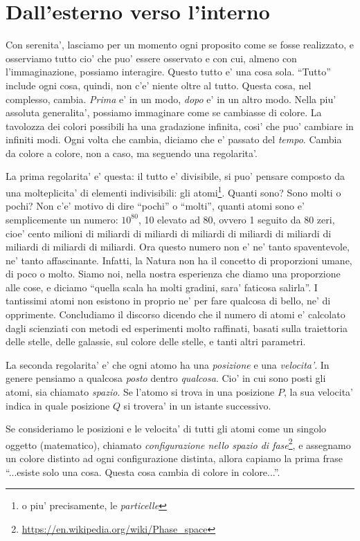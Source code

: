 \section{Dall'esterno verso l'interno}
\label{extInt}
Con serenita', lasciamo per un momento ogni proposito come se fosse realizzato, e osserviamo tutto cio' che puo' essere osservato e con cui, almeno con l'immaginazione, possiamo interagire. Questo tutto e' una cosa sola. ``Tutto'' include ogni cosa, quindi, non c'e' niente oltre al tutto.
Questa cosa, nel complesso, cambia. \emph{Prima} e' in un modo, \emph{dopo} e' in un altro modo. Nella piu' assoluta generalita', possiamo immaginare come se cambiasse di colore. La tavolozza dei colori possibili ha una gradazione infinita, cosi' che puo' cambiare in infiniti modi. Ogni volta che cambia, diciamo che e' passato del \emph{tempo}. Cambia da colore a colore, non a caso, ma seguendo una regolarita'. 

La prima regolarita' e' questa: il tutto e' divisibile, si puo' pensare composto da una molteplicita' di elementi indivisibili: gli atomi\footnote{o piu' precisamente, le \emph{particelle}}.
Quanti sono? Sono molti o pochi? Non c'e' motivo di dire ``pochi'' o ``molti'', quanti atomi sono  e' semplicemente un numero: $10^{80}$, 10 elevato ad 80, ovvero 1 seguito da 80 zeri, cioe' cento milioni di miliardi di miliardi di miliardi di miliardi di miliardi di miliardi di miliardi di miliardi. 
Ora questo numero non e' ne' tanto spaventevole, ne' tanto affascinante. Infatti, la Natura non ha il concetto di proporzioni umane, di poco o molto. Siamo noi, nella nostra esperienza che diamo una proporzione alle cose, e diciamo ``quella scala ha molti gradini, sara' faticosa salirla''. 
I tantissimi atomi non esistono in proprio ne' per fare qualcosa di bello, ne' di opprimente.
Concludiamo il discorso dicendo che il numero di atomi e' calcolato dagli scienziati con metodi ed esperimenti molto raffinati, basati sulla traiettoria delle stelle, delle galassie, sul colore delle stelle, e tanti altri parametri.

La seconda regolarita' e' che ogni atomo ha una \emph{posizione} e una \emph{velocita'}. In genere pensiamo a qualcosa \emph{posto} dentro \emph{qualcosa}. Cio' in cui sono posti gli atomi, sia chiamato \emph{spazio}. Se l'atomo si trova in una posizione $P$, la sua velocita' indica in quale posizione $Q$ si trovera' in un istante successivo. 

Se consideriamo le posizioni e le velocita' di tutti gli atomi come un singolo oggetto (matematico), chiamato \emph{configurazione nello spazio di fase}\footnote{\url{https://en.wikipedia.org/wiki/Phase\_space}}, e assegnamo un colore distinto ad ogni configurazione distinta, allora capiamo la prima frase ``...esiste solo una cosa. Questa cosa cambia di colore in colore...''.

